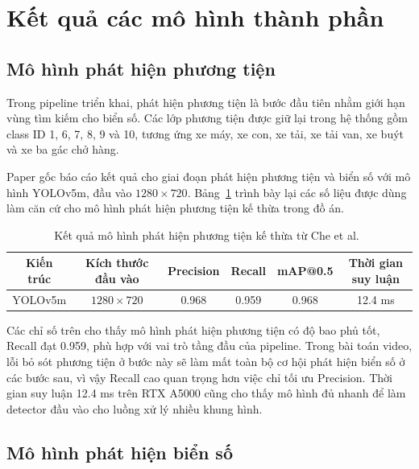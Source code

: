 \documentclass[../DoAn.tex]{subfiles}
\begin{document}
\section{Kết quả các mô hình thành phần}
\label{section:5.2}

\subsection{Mô hình phát hiện phương tiện}
\label{subsection:5.2.1}

Trong pipeline triển khai, phát hiện phương tiện là bước đầu tiên nhằm giới hạn vùng tìm kiếm cho biển số. Các lớp phương tiện được giữ lại trong hệ thống gồm class ID 1, 6, 7, 8, 9 và 10, tương ứng xe máy, xe con, xe tải, xe tải van, xe buýt và xe ba gác chở hàng.

Paper gốc báo cáo kết quả cho giai đoạn phát hiện phương tiện và biển số với mô hình YOLOv5m, đầu vào \(1280 \times 720\). Bảng~\ref{tab:vehicle-detector-result} trình bày lại các số liệu được dùng làm căn cứ cho mô hình phát hiện phương tiện kế thừa trong đồ án.

\begin{table}[htbp]
\centering
\caption{Kết quả mô hình phát hiện phương tiện kế thừa từ Che et al.~\cite{che2023ctm}}
\label{tab:vehicle-detector-result}
\begin{tabular}{|c|c|c|c|c|c|}
\hline
\textbf{Kiến trúc} & \textbf{Kích thước đầu vào} & \textbf{Precision} & \textbf{Recall} & \textbf{mAP@0.5} & \textbf{Thời gian suy luận} \\
\hline
YOLOv5m & \(1280 \times 720\) & 0.968 & 0.959 & 0.968 & 12.4 ms \\
\hline
\end{tabular}
\end{table}

Các chỉ số trên cho thấy mô hình phát hiện phương tiện có độ bao phủ tốt, Recall đạt 0.959, phù hợp với vai trò tầng đầu của pipeline. Trong bài toán video, lỗi bỏ sót phương tiện ở bước này sẽ làm mất toàn bộ cơ hội phát hiện biển số ở các bước sau, vì vậy Recall cao quan trọng hơn việc chỉ tối ưu Precision. Thời gian suy luận 12.4 ms trên RTX A5000 cũng cho thấy mô hình đủ nhanh để làm detector đầu vào cho luồng xử lý nhiều khung hình.

\subsection{Mô hình phát hiện biển số}
\label{subsection:5.2.2}
\end{document}
